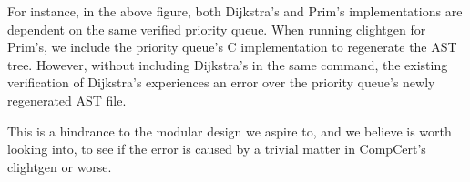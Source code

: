For instance, in the above figure, both Dijkstra's and Prim's implementations are dependent on the same verified priority queue. When running clightgen for Prim's, we include the priority queue's C implementation to regenerate the AST tree. However, without including Dijkstra's in the same command, the existing verification of Dijkstra's experiences an error over the priority queue's newly regenerated AST file.

This is a hindrance to the modular design we aspire to, and we believe is worth looking into, to see if the error is caused by a trivial matter in CompCert's clightgen or worse.